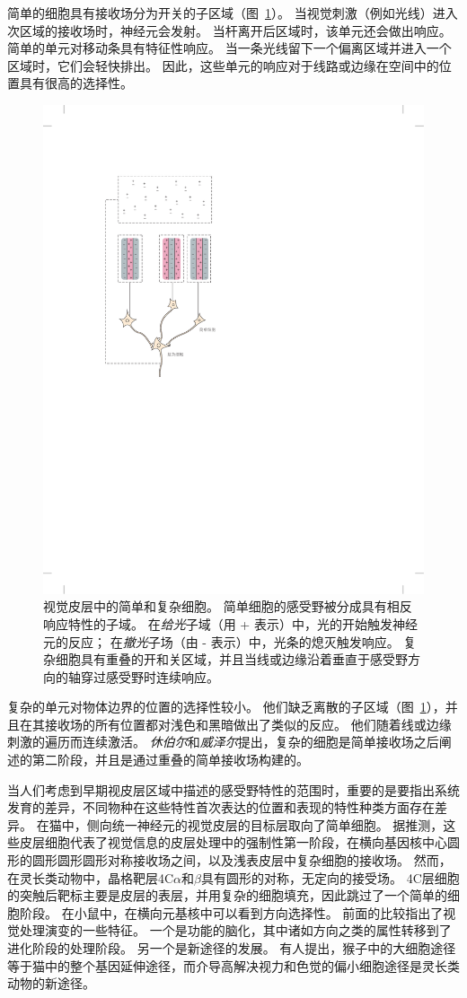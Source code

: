 简单的细胞具有接收场分为开关的子区域（图~\ref{fig:23_4}）。
当视觉刺激（例如光线）进入次区域的接收场时，神经元会发射。
当杆离开后区域时，该单元还会做出响应。
简单的单元对移动条具有特征性响应。
当一条光线留下一个偏离区域并进入一个区域时，它们会轻快排出。
因此，这些单元的响应对于线路或边缘在空间中的位置具有很高的选择性。


\begin{figure}[htbp]
	\centering
	\includegraphics[width=0.55\linewidth]{chap23/fig_23_4}
	\caption{视觉皮层中的简单和复杂细胞。
		简单细胞的感受野被分成具有相反响应特性的子域。
		在\textit{给光}子域（用 + 表示）中，光的开始触发神经元的反应；
		在\textit{撤光}子场（由 - 表示）中，光条的熄灭触发响应。
		复杂细胞具有重叠的开和关区域，并且当线或边缘沿着垂直于感受野方向的轴穿过感受野时连续响应。}
	\label{fig:23_4}
\end{figure}


复杂的单元对物体边界的位置的选择性较小。
他们缺乏离散的子区域（图~\ref{fig:23_4}），并且在其接收场的所有位置都对浅色和黑暗做出了类似的反应。
他们随着线或边缘刺激的遍历而连续激活。
\textit{休伯尔}和\textit{威泽尔}提出，复杂的细胞是简单接收场之后阐述的第二阶段，并且是通过重叠的简单接收场构建的。


当人们考虑到早期视皮层区域中描述的感受野特性的范围时，重要的是要指出系统发育的差异，不同物种在这些特性首次表达的位置和表现的特性种类方面存在差异。
在猫中，侧向统一神经元的视觉皮层的目标层取向了简单细胞。
据推测，这些皮层细胞代表了视觉信息的皮层处理中的强制性第一阶段，在横向基因核中心圆形的圆形圆形圆形对称接收场之间，以及浅表皮层中复杂细胞的接收场。
然而，在灵长类动物中，晶格靶层4C$\alpha$和$\beta$具有圆形的对称，无定向的接受场。
4C层细胞的突触后靶标主要是皮层的表层，并用复杂的细胞填充，因此跳过了一个简单的细胞阶段。
在小鼠中，在横向元基核中可以看到方向选择性。
前面的比较指出了视觉处理演变的一些特征。
一个是功能的脑化，其中诸如方向之类的属性转移到了进化阶段的处理阶段。
另一个是新途径的发展。
有人提出，猴子中的大细胞途径等于猫中的整个基因延伸途径，而介导高解决视力和色觉的偏小细胞途径是灵长类动物的新途径。


